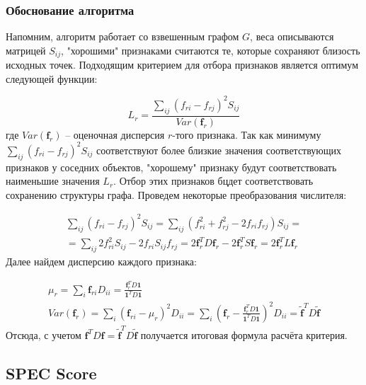 \subsubsection{Обоснование алгоритма}

Напомним, алгоритм работает со взвешенным графом $G$, веса описываются матрицей $S_{ij}$, "хорошими" признаками считаются те, которые сохраняют близость исходных точек. Подходящим критерием для отбора признаков является оптимум следующей функции:

\begin{equation} \label{goal_function:1}
	L_r=\frac{\sum_{ij}(f_{ri} - f_{rj})^2 S_{ij}}{Var(\mathbf{f}_r)}
\end{equation} 
где $Var(\mathbf{f}_r)$ -- оценочная дисперсия $r$-того признака. Так как минимуму $\sum_{ij}(f_{ri} - f_{rj})^2 S_{ij}$ соответствуют более близкие значения соответствующих признаков у соседних объектов, "хорошему" признаку будут соответствовать наименьшие значения $L_r$. Отбор этих признаков бцдет соответствовать сохранению структуры графа. Проведем некоторые преобразования числителя:

\begin{equation}
	\begin{array}{l}
	\sum_{ij} (f_{ri} - f_{rj})^2 S_{ij} = \sum_{ij} (f_{ri}^2 + f_{rj}^2 -2 f_{ri} f_{rj}) S_{ij} = \\
	= \sum_{ij} 2 f_{ri}^2 S_{ij} - 2 f_{ri}  S_{ij} f_{rj} = 2 \mathbf{f}_r^T D \mathbf{f}_r - 2 \mathbf{f}_r^T S \mathbf{f}_r = 2 \mathbf{f}_r^T L \mathbf{f}_r
	\end{array}
\end{equation}
Далее найдем дисперсию каждого признака:

\begin{equation}
	\begin{array}{l}
	\mu_r = \sum_i \mathbf{f}_{ri} D_{ii} = \frac{\mathbf{f}_r^T D \mathbf{1}}{\mathbf{1}^T D \mathbf{1}} \\
	Var(\mathbf{f}_r) = \sum_i (\mathbf{f}_{ri} - \mu_r)^2 D_{ii} = \sum_i (\mathbf{f}_r - \frac{\mathbf{f}_r^T D \mathbf{1}}{\mathbf{1}^T D \mathbf{1}})^2 D_{ii} = \widetilde{\mathbf{f}}^T D \widetilde{\mathbf{f}}
	\end{array}
\end{equation}
Отсюда, с учетом $\mathbf{f}^T D \mathbf{f} = \widetilde{\mathbf{f}}^T D \widetilde{\mathbf{f}}$ получается итоговая формула расчёта критерия.

\subsection{SPEC Score}
